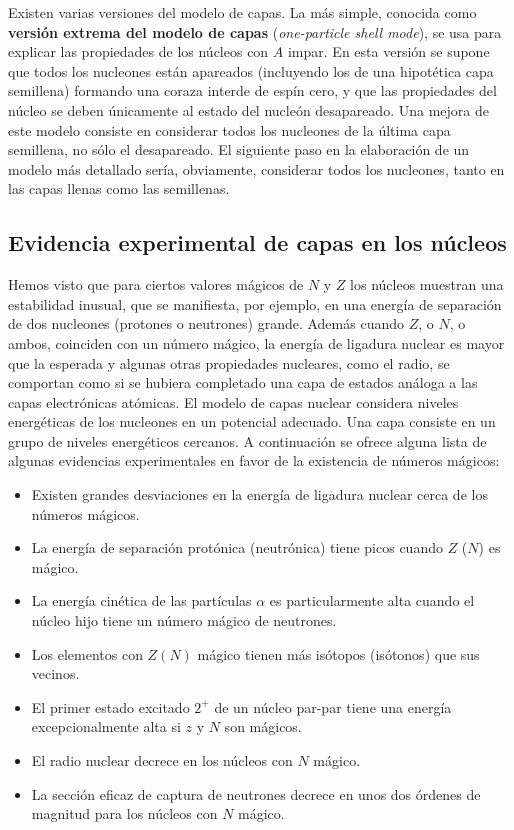 Existen varias versiones del modelo de capas. La más simple, conocida como \textbf{versión extrema del modelo de capas} (\textit{one-particle shell mode}), se usa para explicar las propiedades de los núcleos con $A$ impar. En esta versión se supone que todos los nucleones están apareados (incluyendo los de una hipotética capa semillena) formando una coraza interde de espín cero, y que las propiedades del núcleo se deben únicamente al estado del nucleón desapareado. Una mejora de este modelo consiste en considerar todos los nucleones de la última capa semillena, no sólo el desapareado. El siguiente paso en la elaboración de un modelo más detallado sería, obviamente, considerar todos los nucleones, tanto en las capas llenas como las semillenas.

\subsection{Evidencia experimental de capas en los núcleos}

Hemos visto que para ciertos valores mágicos de $N$ y $Z$ los núcleos muestran una estabilidad inusual, que se manifiesta, por ejemplo, en una energía de separación de dos nucleones (protones o neutrones) grande. Además cuando $Z$, o $N$, o ambos, coinciden con un número mágico, la energía de ligadura nuclear es mayor que la esperada y algunas otras propiedades nucleares, como el radio, se comportan como si se hubiera completado una capa de estados análoga a las capas electrónicas atómicas. El modelo de capas nuclear considera niveles energéticas de los nucleones en un potencial adecuado. Una capa consiste en un grupo de niveles energéticos cercanos. A continuación se ofrece alguna lista de algunas evidencias experimentales en favor de la existencia de números mágicos:

\begin{itemize}
	\item Existen grandes desviaciones en la energía de ligadura nuclear cerca de los números mágicos. 
	\item La energía de separación protónica (neutrónica) tiene picos cuando $Z$ ($N$) es mágico.
	\item La energía cinética de las partículas $\alpha$ es particularmente alta cuando el núcleo hijo tiene un número mágico de neutrones.
	\item Los elementos con $Z(N)$ mágico tienen más isótopos (isótonos) que sus vecinos.
	\item El primer estado excitado $2^+$ de un núcleo par-par tiene una energía excepcionalmente alta si $z$ y $N$ son mágicos.
	\item El radio nuclear decrece en los núcleos con $N$ mágico.
	\item La sección eficaz de captura de neutrones decrece en unos dos órdenes de magnitud para los núcleos con $N$ mágico.
\end{itemize}


